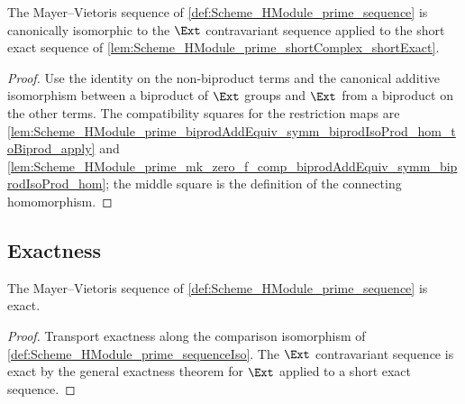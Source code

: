 \begin{definition}\leanok
  \label{def:Scheme_HModule_prime_sequenceIso}

  The Mayer--Vietoris sequence of \cref{def:Scheme_HModule_prime_sequence} is canonically isomorphic to the \(\Ext\) contravariant sequence applied to the short exact sequence of \cref{lem:Scheme_HModule_prime_shortComplex_shortExact}.
\end{definition}

\begin{proof}

  \leanok
  Use the identity on the non-biproduct terms and the canonical additive isomorphism between a biproduct of \(\Ext\) groups and \(\Ext\) from a biproduct on the other terms. The compatibility squares for the restriction maps are \cref{lem:Scheme_HModule_prime_biprodAddEquiv_symm_biprodIsoProd_hom_toBiprod_apply} and \cref{lem:Scheme_HModule_prime_mk_zero_f_comp_biprodAddEquiv_symm_biprodIsoProd_hom}; the middle square is the definition of the connecting homomorphism.
\end{proof}

\subsection{Exactness}

\begin{theorem}\leanok
  \label{thm:Scheme_HModule_prime_sequence_exact}

  The Mayer--Vietoris sequence of \cref{def:Scheme_HModule_prime_sequence} is exact.
\end{theorem}

\begin{proof}

  \leanok
  Transport exactness along the comparison isomorphism of \cref{def:Scheme_HModule_prime_sequenceIso}. The \(\Ext\) contravariant sequence is exact by the general exactness theorem for \(\Ext\) applied to a short exact sequence.
\end{proof}

